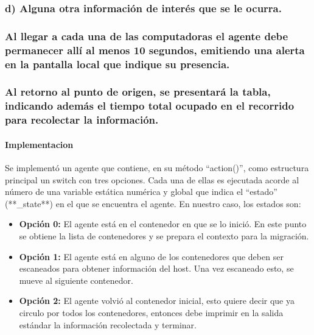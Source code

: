 \documentclass[11pt]{extarticle}
\begin{document}
    \hypertarget{d-alguna-otra-informaciuxf3n-de-interuxe9s-que-se-le-ocurra.}{%
\subsubsection{d) Alguna otra información de interés que se le
ocurra.}\label{d-alguna-otra-informaciuxf3n-de-interuxe9s-que-se-le-ocurra.}}

    \hypertarget{al-llegar-a-cada-una-de-las-computadoras-el-agente-debe-permanecer-alluxed-al-menos-10-segundos-emitiendo-una-alerta-en-la-pantalla-local-que-indique-su-presencia.}{%
\subsubsection{Al llegar a cada una de las computadoras el agente debe
permanecer allí al menos 10 segundos, emitiendo una alerta en la
pantalla local que indique su
presencia.}\label{al-llegar-a-cada-una-de-las-computadoras-el-agente-debe-permanecer-alluxed-al-menos-10-segundos-emitiendo-una-alerta-en-la-pantalla-local-que-indique-su-presencia.}}

    \hypertarget{al-retorno-al-punto-de-origen-se-presentaruxe1-la-tabla-indicando-ademuxe1s-el-tiempo-total-ocupado-en-el-recorrido-para-recolectar-la-informaciuxf3n.}{%
\subsubsection{Al retorno al punto de origen, se presentará la tabla,
indicando además el tiempo total ocupado en el recorrido para recolectar
la
información.}\label{al-retorno-al-punto-de-origen-se-presentaruxe1-la-tabla-indicando-ademuxe1s-el-tiempo-total-ocupado-en-el-recorrido-para-recolectar-la-informaciuxf3n.}}

    \hypertarget{implementacion}{%
\paragraph{Implementacion}\label{implementacion}}

Se implementó un agente que contiene, en su método ``action()'', como
estructura principal un switch con tres opciones. Cada una de ellas es
ejecutada acorde al número de una variable estática numérica y global
que indica el ``estado'' (**\_state**) en el que se encuentra el agente.
En nuestro caso, los estados son:

\begin{itemize}
\item
  \textbf{Opción 0:} El agente está en el contenedor en que se lo
  inició. En este punto se obtiene la lista de contenedores y se prepara
  el contexto para la migración.
\item
  \textbf{Opción 1:} El agente está en alguno de los contenedores que
  deben ser escaneados para obtener información del host. Una vez
  escaneado esto, se mueve al siguiente contenedor.
\item
  \textbf{Opción 2:} El agente volvió al contenedor inicial, esto quiere
  decir que ya circulo por todos los contenedores, entonces debe
  imprimir en la salida estándar la información recolectada y terminar.
\end{itemize}
\end{document}
